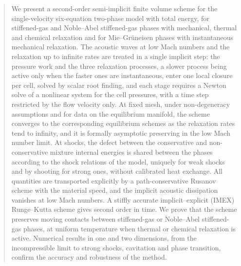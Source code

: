 \documentclass[a4paper,fleqn]{cas-sc}
\begin{document}
\fntext[1]{}


\begin{abstract}
We present a second-order semi-implicit finite volume scheme for the single-velocity six-equation two-phase model
with total energy, for stiffened-gas and Noble--Abel stiffened-gas phases with mechanical, thermal and chemical
relaxation and for Mie--Gr\"uneisen phases with instantaneous mechanical relaxation. The acoustic waves at low Mach
numbers and the relaxation up to infinite rates are treated in a single implicit step: the pressure work and the three
relaxation processes, a slower process being active only when the faster ones are instantaneous, enter one local
closure per cell, solved by scalar root finding, and each stage requires a Newton solve of a nonlinear system for the
cell pressures, with a time step restricted by the flow velocity only. At fixed mesh, under non-degeneracy
assumptions and for data on the equilibrium manifold, the scheme converges to the corresponding equilibrium schemes as the relaxation rates tend to infinity,
and it is formally asymptotic preserving in the low Mach number limit. At shocks, the defect between the conservative
and non-conservative mixture internal energies is shared between the phases according to the shock relations of the
model, uniquely for weak shocks and by shooting for strong ones, without calibrated heat exchange. All quantities are
transported explicitly by a path-conservative Rusanov scheme with the material speed, and the implicit acoustic
dissipation vanishes at low Mach numbers. A stiffly accurate implicit--explicit (IMEX) Runge--Kutta scheme gives
second order in time. We prove that the scheme preserves moving contacts between stiffened-gas or Noble--Abel
stiffened-gas phases, at uniform temperature when thermal or chemical relaxation is active. Numerical results in one
and two dimensions, from the incompressible limit to strong shocks, cavitation and phase transition, confirm the
accuracy and robustness of the method.
\end{abstract}



\begin{highlights}
\item
\item
\item
\end{highlights}
\end{document}

